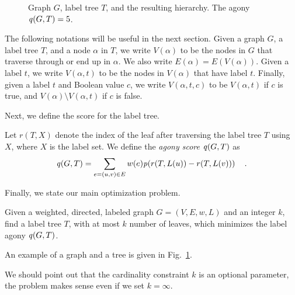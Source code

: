 \begin{figure}
\caption{Graph $G$, label tree $T$, and the resulting hierarchy. The agony $\labelscore{G, T} =5$.}
\label{fig:toy}
\end{figure}



The following notations will be useful in the next section. Given a graph $G$,
a label tree $T$, and a node $\alpha$ in $T$, we write $V(\alpha)$ to be the nodes in $G$
that traverse through or end up in $\alpha$. We also write $E(\alpha) = E(V(\alpha))$.
Given a label $t$, we write $V(\alpha, t)$ to be the nodes in $V(\alpha)$ that have label $t$.
Finally, given a label $t$ and Boolean value $c$, we write $V(\alpha, t, c)$ to
be $V(\alpha, t)$ if $c$ is true, and $V(\alpha) \setminus V(\alpha, t)$ if $c$ is false.

Next, we define the score for the label tree.

\begin{definition}
Let $r(T, X)$ denote the index of the leaf after  traversing the label tree $T$ using $X$, where  $X$ is the label set. We define the \emph{agony score} $\labelscore{G, T}$ as
\[
	\labelscore{G, T} = \sum_{e = (u, v) \in E} w(e) \pen{r(T, L(u)) - r(T, L(v))}\quad.
\]
\end{definition}

Finally, we state our main optimization problem.

\begin{problem}[\prblagy]
Given a weighted, directed, labeled graph  $G = (V, E, w, L)$ and an integer $k$, 
find a label tree $T$, with at most $k$ number of leaves, which minimizes the label agony $\labelscore{G, T}$.
\end{problem}

An example of a graph and a tree is given in Fig.~\ref{fig:toy}.

We should point out that the cardinality constraint $k$ is an optional parameter,
the problem makes sense even if we set $k = \infty$.
